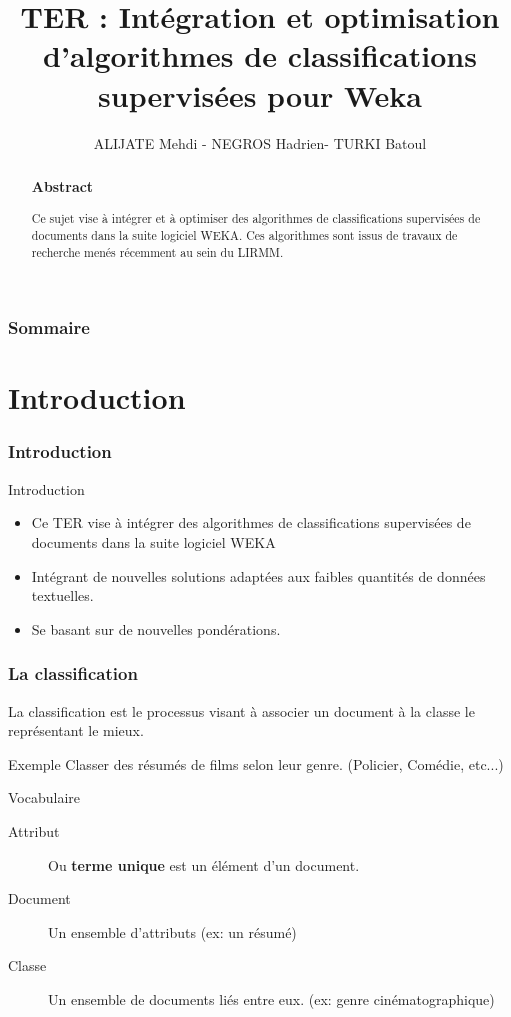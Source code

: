 \documentclass[12pt]{beamer}
\author{ALIJATE Mehdi -  NEGROS Hadrien- TURKI Batoul}
\title{TER :  Intégration et optimisation d’algorithmes de classifications supervisées pour Weka
}
\institute{Université Montpellier 2 - LIRMM}
\begin{document}
\begin{frame}
\titlepage 
\end{frame}



\begin{frame}
\begin{abstract}

\frametitle{Abstract}
\begin{center}
Ce sujet vise à intégrer et à optimiser des algorithmes de classifications supervisées de documents dans la suite logiciel WEKA. Ces algorithmes sont issus de travaux de recherche menés récemment au sein du LIRMM.
\end{center}
\end{abstract}
\end{frame}

\begin{frame}
\tableofcontents
\frametitle{Sommaire}


\end{frame}

\section{Introduction}

\begin{frame}
\frametitle{Introduction}
\begin{block}{Introduction}
\begin{itemize}
\item Ce TER vise à intégrer des algorithmes de classifications supervisées de documents dans la suite logiciel WEKA 
\item Intégrant de nouvelles solutions adaptées aux faibles quantités de données textuelles.
\item Se basant sur de nouvelles pondérations.
\end{itemize} 
\end{block}
\end{frame}
\begin{frame}
\frametitle{La classification}
La classification est le processus visant à associer un document à la classe le représentant le mieux.
\begin{block}{Exemple}
Classer des résumés de films selon leur genre. (Policier, Comédie, etc...)
\end{block}
\begin{block}{Vocabulaire}
\begin{description}
\item[Attribut] Ou \textbf{terme unique} est un élément d'un document.
\item[Document] Un ensemble d'attributs (ex: un résumé)
\item[Classe] Un ensemble de documents liés entre eux. (ex: genre cinématographique)
\end{description}
\end{block}


\end{frame}
\end{document}
